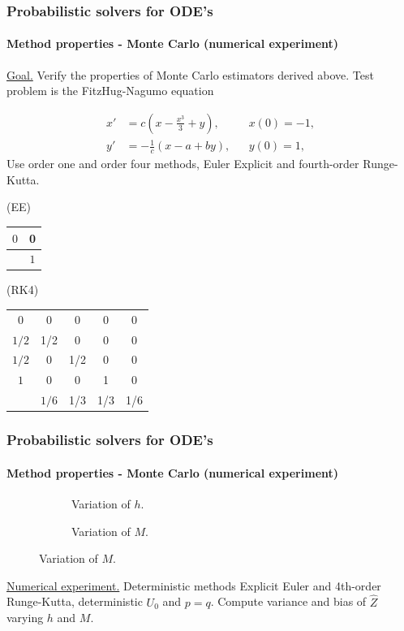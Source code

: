 \documentclass{beamer}
\begin{document}
\begin{frame}
	\frametitle{Probabilistic solvers for ODE's}
	\framesubtitle{Method properties - Monte Carlo (numerical experiment)}		
	
	\underline{Goal.} Verify the properties of Monte Carlo estimators derived above. Test problem is the FitzHug-Nagumo equation
	
	\begin{equation*}
	\begin{aligned}
	x' &= c\left(x - \frac{x^3}{3} + y\right), && x(0) = -1, \\
	y' &= -\frac{1}{c}(x - a + by), && y(0) = 1,
	\end{aligned}
	\end{equation*}
	Use order one and order four methods, Euler Explicit and fourth-order Runge-Kutta.\\
	\begin{minipage}{0.3\linewidth} 
		\begin{center}
			(EE)
			\begin{tabular}{c|c}
				$0$ & 0 \\
				\hline 
				&$1$ 
			\end{tabular}
		\end{center}
	\end{minipage}
	\begin{minipage}{0.6\linewidth} 
		\begin{center}
			(RK4)
			\begin{tabular}{c|cccc}
				$0$ & 0 & 0 & 0 & 0\\
				$1/2$ & 1/2 & 0 & 0 & 0\\
				$1/2$ & 0 & 1/2 & 0 & 0\\
				$1$ & 0 & 0 & 1 & 0\\
				\hline 
				&$1/6$ & 1/3 & 1/3 & 1/6
			\end{tabular}
		\end{center}
	\end{minipage}

	
\end{frame}


\begin{frame}
	\frametitle{Probabilistic solvers for ODE's}
	\framesubtitle{Method properties - Monte Carlo (numerical experiment)}	
	
	\begin{figure}
		\centering
		\begin{subfigure}{0.49\linewidth}
			\centering
			\resizebox{1.0\linewidth}{!}{}
			\caption{Variation of $h$.}
		\end{subfigure}
		\begin{subfigure}{0.49\linewidth}
			\centering
			\resizebox{1.0\linewidth}{!}{}
			\caption{Variation of $M$.}
		\end{subfigure}
	\end{figure}
	
	\underline{Numerical experiment.} Deterministic methods Explicit Euler and 4th-order Runge-Kutta, deterministic $U_0$ and $p = q$. Compute variance and bias of $\hat Z$ varying $h$ and $M$.
\end{frame}
\end{document}
